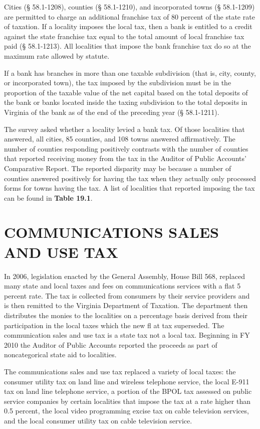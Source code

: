 \documentclass[
]{book}
\begin{document}
Cities (§ 58.1-1208), counties (§ 58.1-1210), and incorporated towns (§ 58.1-1209) are permitted to charge an additional franchise tax of 80 percent of the state rate of taxation. If a locality imposes the local tax, then a bank is entitled to a credit against the state franchise tax equal to the total amount of local franchise tax paid (§ 58.1-1213). All localities that impose the bank franchise tax do so at the maximum rate allowed by statute.

If a bank has branches in more than one taxable subdivision (that is, city, county, or incorporated town), the tax imposed by the subdivision must be in the proportion of the taxable value of the net capital based on the total deposits of the bank or banks located inside the taxing subdivision to the total deposits in Virginia of the bank as of the end of the preceding year (§ 58.1-1211).

The survey asked whether a locality levied a bank tax. Of those localities that answered, all cities, 85 counties, and 108 towns answered affirmatively. The number of counties responding positively contrasts with the number of counties that reported receiving money from the tax in the Auditor of Public Accounts' Comparative Report. The reported disparity may be because a number of counties answered positively for having the tax when they actually only processed forms for towns having the tax. A list of localities that reported imposing the tax can be found in \textbf{Table 19.1}.

\hypertarget{communications-sales-and-use-tax}{%
\section{COMMUNICATIONS SALES AND USE TAX}\label{communications-sales-and-use-tax}}

In 2006, legislation enacted by the General Assembly, House Bill 568, replaced many state and local taxes and fees on communications services with a flat 5 percent rate. The tax is collected from consumers by their service providers and is then remitted to the Virginia Department of Taxation. The department then distributes the monies to the localities on a percentage basis derived from their participation in the local taxes which the new fl at tax superseded. The communication sales and use tax is a state tax not a local tax. Beginning in FY 2010 the Auditor of Public Accounts reported the proceeds as part of noncategorical state aid to localities.

The communications sales and use tax replaced a variety of local taxes: the consumer utility tax on land line and wireless telephone service, the local E-911 tax on land line telephone service, a portion of the BPOL tax assessed on public service companies by certain localities that impose the tax at a rate higher than 0.5 percent, the local video programming excise tax on cable television services, and the local consumer utility tax on cable television service.
\end{document}
